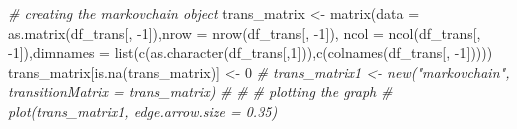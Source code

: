 \documentclass[
]{book}
\newenvironment{Shaded}{\begin{snugshade}}{\end{snugshade}}
\newcommand{\AttributeTok}[1]{\textcolor[rgb]{0.77,0.63,0.00}{#1}}
\newcommand{\CommentTok}[1]{\textcolor[rgb]{0.56,0.35,0.01}{\textit{#1}}}
\newcommand{\DecValTok}[1]{\textcolor[rgb]{0.00,0.00,0.81}{#1}}
\newcommand{\FunctionTok}[1]{\textcolor[rgb]{0.00,0.00,0.00}{#1}}
\newcommand{\NormalTok}[1]{#1}
\newcommand{\OtherTok}[1]{\textcolor[rgb]{0.56,0.35,0.01}{#1}}
\newcommand{\SpecialCharTok}[1]{\textcolor[rgb]{0.00,0.00,0.00}{#1}}
\begin{document}
\begin{Shaded}
\begin{Highlighting}[]
\CommentTok{\# creating the markovchain object}
\NormalTok{trans\_matrix }\OtherTok{\textless{}{-}} \FunctionTok{matrix}\NormalTok{(}\AttributeTok{data =} \FunctionTok{as.matrix}\NormalTok{(df\_trans[, }\SpecialCharTok{{-}}\DecValTok{1}\NormalTok{]),}\AttributeTok{nrow =} \FunctionTok{nrow}\NormalTok{(df\_trans[, }\SpecialCharTok{{-}}\DecValTok{1}\NormalTok{]), }\AttributeTok{ncol =} \FunctionTok{ncol}\NormalTok{(df\_trans[, }\SpecialCharTok{{-}}\DecValTok{1}\NormalTok{]),}\AttributeTok{dimnames =} \FunctionTok{list}\NormalTok{(}\FunctionTok{c}\NormalTok{(}\FunctionTok{as.character}\NormalTok{(df\_trans[,}\DecValTok{1}\NormalTok{])),}\FunctionTok{c}\NormalTok{(}\FunctionTok{colnames}\NormalTok{(df\_trans[, }\SpecialCharTok{{-}}\DecValTok{1}\NormalTok{]))))}
\NormalTok{trans\_matrix[}\FunctionTok{is.na}\NormalTok{(trans\_matrix)] }\OtherTok{\textless{}{-}} \DecValTok{0}
\CommentTok{\# trans\_matrix1 \textless{}{-} new("markovchain", transitionMatrix = trans\_matrix)}
\CommentTok{\# }
\CommentTok{\# \# plotting the graph}
\CommentTok{\# plot(trans\_matrix1, edge.arrow.size = 0.35)}
\end{Highlighting}
\end{Shaded}
\end{document}
